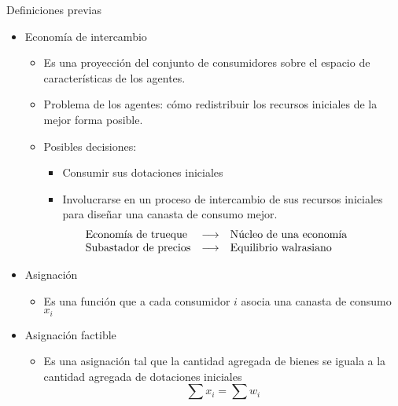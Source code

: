 \begin{frame}{Definiciones previas}
	\begin{itemize}
		\item Economía de intercambio
			\begin{itemize}
				\item Es una proyección del conjunto de consumidores sobre el espacio de características de los agentes.
				\item Problema de los agentes: cómo redistribuir los recursos iniciales de la mejor forma posible.
				\item Posibles decisiones:
					\begin{itemize}
						\item Consumir sus dotaciones iniciales
						\item Involucrarse en un proceso de intercambio de sus recursos iniciales para diseñar una canasta de consumo mejor.
						$$\begin{array}{lcl}
							\hspace{-1cm} \text{Economía de trueque} & \longrightarrow & \text{Núcleo de una economía} \\
							\hspace{-1cm} \text{Subastador de precios} & \longrightarrow & \text{Equilibrio walrasiano}
						\end{array}$$
					\end{itemize}
			\end{itemize}
		\item Asignación
			\begin{itemize}
				\item Es una función que a cada consumidor $i$ asocia una canasta de consumo $x_i$
			\end{itemize}
		\item Asignación factible
			\begin{itemize}
				\item Es una asignación tal que la cantidad agregada de bienes se iguala a la cantidad agregada de dotaciones iniciales
					$$\sum x_i = \sum w_i$$
			\end{itemize}
	\end{itemize}
\end{frame}
